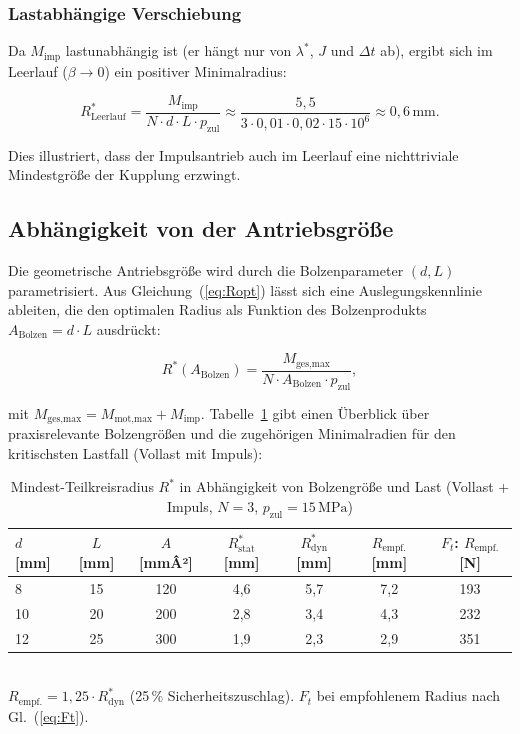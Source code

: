 ﻿\documentclass[a4paper,12pt]{article}
\begin{document}
\subsubsection*{Lastabhängige Verschiebung}

Da $M_\text{imp}$ lastunabhängig ist (er hängt nur von $\lambda^*$, $J$ und
$\Delta t$ ab), ergibt sich im Leerlauf ($\beta \to 0$) ein positiver
Minimalradius:

\begin{equation}
  R^*_\text{Leerlauf} = \frac{M_\text{imp}}{N \cdot d \cdot L \cdot p_\text{zul}}
    \approx \frac{5{,}5}{3 \cdot 0{,}01 \cdot 0{,}02 \cdot 15 \cdot 10^6}
    \approx 0{,}6\,\text{mm}.
  \label{eq:Ropt_leerlauf}
\end{equation}

Dies illustriert, dass der Impulsantrieb auch im Leerlauf eine nichttriviale
Mindestgröße der Kupplung erzwingt.

\subsection{Abhängigkeit von der Antriebsgröße}

Die geometrische Antriebsgröße wird durch die Bolzenparameter $(d, L)$
parametrisiert. Aus Gleichung~(\ref{eq:Ropt}) lässt sich eine
Auslegungskennlinie ableiten, die den optimalen Radius als Funktion des
Bolzenprodukts $A_\text{Bolzen} = d \cdot L$ ausdrückt:

\begin{equation}
  R^*(A_\text{Bolzen}) =
    \frac{M_\text{ges,max}}{N \cdot A_\text{Bolzen} \cdot p_\text{zul}},
  \label{eq:Ropt_Abolzen}
\end{equation}

\noindent
mit $M_\text{ges,max} = M_\text{mot,max} + M_\text{imp}$. Tabelle~\ref{tab:kupplung}
gibt einen Überblick über praxisrelevante Bolzengrößen und die zugehörigen
Minimalradien für den kritischsten Lastfall (Vollast mit Impuls):

\begin{table}[h]
\centering
\caption{Mindest-Teilkreisradius $R^*$ in Abhängigkeit von Bolzengröße und Last
(Vollast + Impuls, $N=3$, $p_\text{zul}=15\,\text{MPa}$)}
\label{tab:kupplung}
\begin{tabular}{lcccccc}
\toprule
$d$ [mm] & $L$ [mm] & $A$ [mmÂ²] & $R^*_\text{stat}$ [mm] & $R^*_\text{dyn}$ [mm]
         & $R_\text{empf.}$ [mm] & $F_t$:  $R_\text{empf.}$ [N] \\
\midrule
8  & 15 & 120 & 4{,}6 & 5{,}7 & 7{,}2 & 193 \\
10 & 20 & 200 & 2{,}8 & 3{,}4 & 4{,}3 & 232 \\
12 & 25 & 300 & 1{,}9 & 2{,}3 & 2{,}9 & 351 \\
\bottomrule
\end{tabular}
\\[0.5em]
\small $R_\text{empf.} = 1{,}25 \cdot R^*_\text{dyn}$ (25\,\% Sicherheitszuschlag).
$F_t$ bei empfohlenem Radius nach Gl.~(\ref{eq:Ft}).
\end{table}
\end{document}
